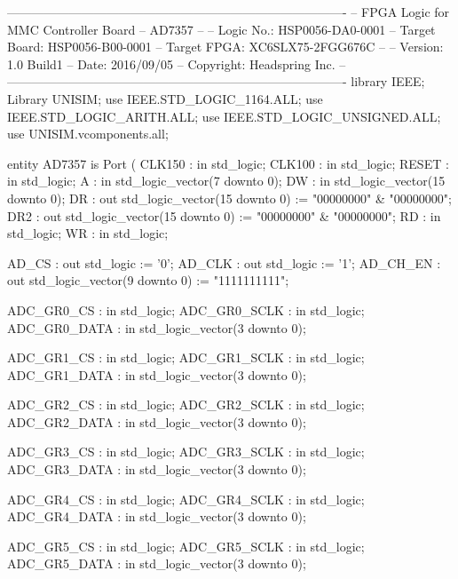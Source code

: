 
\begin{mylisting}[language=VHDL,caption=AD変換モジュール,label=appF_ADC_module_VHDL]

----------------------------------------------------------------------------------
-- FPGA Logic for MMC Controller Board
-- AD7357
--
--		Logic No.:		HSP0056-DA0-0001
--		Target Board:	HSP0056-B00-0001
--		Target FPGA:	XC6SLX75-2FGG676C
--
--		Version:		1.0 Build1
--		Date:			2016/09/05
--		Copyright:		Headspring Inc.
--
----------------------------------------------------------------------------------
library IEEE;
Library UNISIM;
use IEEE.STD_LOGIC_1164.ALL;
use IEEE.STD_LOGIC_ARITH.ALL;
use IEEE.STD_LOGIC_UNSIGNED.ALL;
use UNISIM.vcomponents.all;

entity AD7357 is
	Port (
		CLK150		: in	std_logic;
		CLK100		: in	std_logic;
		RESET		: in	std_logic;
		A		: in	std_logic_vector(7 downto 0);
		DW		: in	std_logic_vector(15 downto 0);
		DR		: out	std_logic_vector(15 downto 0)	:= "00000000" & "00000000";
		DR2	: out	std_logic_vector(15 downto 0)	:= "00000000" & "00000000";
		RD		: in	std_logic;
		WR		: in	std_logic;
		
		AD_CS		: out	std_logic							:= '0';
		AD_CLK		: out	std_logic							:= '1';
		AD_CH_EN	: out	std_logic_vector(9 downto 0)		:= "1111111111";

		ADC_GR0_CS		: in	std_logic;
		ADC_GR0_SCLK	: in	std_logic;
		ADC_GR0_DATA	: in	std_logic_vector(3 downto 0);

		ADC_GR1_CS		: in	std_logic;
		ADC_GR1_SCLK	: in	std_logic;
		ADC_GR1_DATA	: in	std_logic_vector(3 downto 0);

		ADC_GR2_CS		: in	std_logic;
		ADC_GR2_SCLK	: in	std_logic;
		ADC_GR2_DATA	: in	std_logic_vector(3 downto 0);

		ADC_GR3_CS		: in	std_logic;
		ADC_GR3_SCLK	: in	std_logic;
		ADC_GR3_DATA	: in	std_logic_vector(3 downto 0);

		ADC_GR4_CS		: in	std_logic;
		ADC_GR4_SCLK	: in	std_logic;
		ADC_GR4_DATA	: in	std_logic_vector(3 downto 0);

		ADC_GR5_CS		: in	std_logic;
		ADC_GR5_SCLK	: in	std_logic;
		ADC_GR5_DATA	: in	std_logic_vector(3 downto 0);


\end{mylisting}
